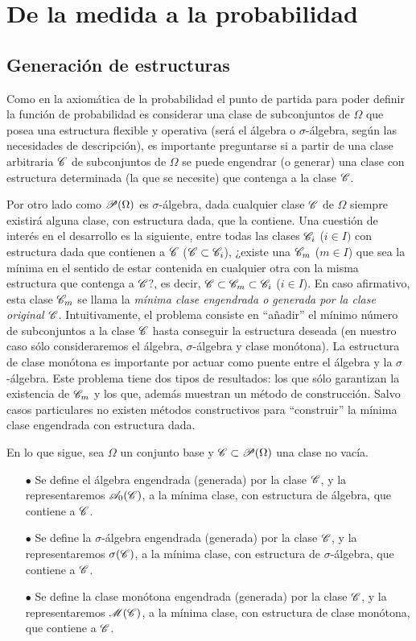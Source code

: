 \chapter{De la medida a la probabilidad}

\section{Generación de estructuras}
Como en la axiomática de la probabilidad el punto de partida para poder definir la función de probabilidad es considerar una clase de subconjuntos de $\Omega$ que posea una estructura flexible y operativa (será el álgebra o $\sigma$-álgebra, según las necesidades de descripción), es importante preguntarse si a partir de una clase arbitraria $\mathcal{C}$ de subconjuntos de $\Omega$ se puede engendrar (o generar) una clase con estructura determinada (la que se necesite) que contenga a la clase $\mathcal{C}$.

Por otro lado como $\operatorname{\mathcal{P}}(\Omega)$ es $\sigma$-álgebra, dada cualquier clase $\mathcal{C}$ de $\Omega$ siempre existirá alguna clase, con estructura dada, que la contiene. Una cuestión de interés en el desarrollo es la siguiente, entre todas las clases $\mathcal{C}_i$ ($i\in I)$ con estructura dada que contienen a $\mathcal{C}$ ($\mathcal{C}\subset\mathcal{C}_i$), ¿existe una $\mathcal{C}_m$ ($m\in I$) que sea la mínima en el sentido de estar contenida en cualquier otra con la misma estructura que contenga a $\mathcal{C}$?, es decir, $\mathcal{C}\subset\mathcal{C}_m\subset\mathcal{C}_i$ ($i\in I$). En caso afirmativo, esta clase $\mathcal{C}_m$ se llama la {\it mínima clase engendrada o generada por la clase original $\mathcal{C}$}. Intuitivamente, el problema consiste en ``añadir'' el mínimo número de subconjuntos a la clase $\mathcal{C}$ hasta conseguir la estructura deseada (en nuestro caso sólo consideraremos el álgebra, $\sigma$-álgebra y clase monótona). La estructura de clase monótona es importante por actuar como puente entre el álgebra y la $\sigma$-álgebra. Este problema tiene dos tipos de resultados: los que sólo garantizan la existencia de $\mathcal{C}_m$ y los que, además muestran un método de construcción. Salvo casos particulares no existen métodos constructivos para ``construir'' la mínima clase engendrada con estructura dada.

En lo que sigue, sea $\Omega$ un conjunto base y $\mathcal{C}\subset\operatorname{\mathcal{P}}(\Omega)$ una clase no vacía.
\begin{itemize}
    \item[$\bullet$] Se define el álgebra engendrada (generada) por la clase $\mathcal{C}$, y la representaremos $\operatorname{\mathcal{A}_0}(\mathcal{C})$, a la mínima clase, con estructura de álgebra, que contiene a $\mathcal{C}$.
    \item[$\bullet$] Se define la $\sigma$-álgebra engendrada (generada) por la clase $\mathcal{C}$, y la representaremos $\operatorname{\sigma}(\mathcal{C})$, a la mínima clase, con estructura de $\sigma$-álgebra, que contiene a $\mathcal{C}$.
    \item[$\bullet$] Se define la clase monótona engendrada (generada) por la clase $\mathcal{C}$, y la representaremos $\operatorname{\mathcal{M}}(\mathcal{C})$, a la mínima clase, con estructura de clase monótona, que contiene a $\mathcal{C}$.
\end{itemize}

